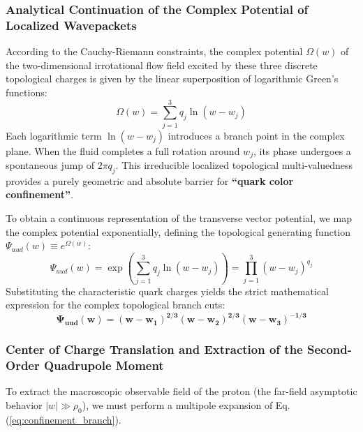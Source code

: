 \documentclass[12pt, a4paper]{article}
\begin{document}
\subsubsection{Analytical Continuation of the Complex Potential of Localized Wavepackets}

According to the Cauchy-Riemann constraints, the complex potential $\Omega(w)$ of the two-dimensional irrotational flow field excited by these three discrete topological charges is given by the linear superposition of logarithmic Green's functions:
\begin{equation}
\Omega(w) = \sum_{j=1}^3 q_j \ln(w - w_j) \label{eq:complex_potential_omega}
\end{equation}
Each logarithmic term $\ln(w - w_j)$ introduces a branch point in the complex plane. When the fluid completes a full rotation around $w_j$, its phase undergoes a spontaneous jump of $2\pi q_j$. This irreducible localized topological multi-valuedness provides a purely geometric and absolute barrier for \textbf{``quark color confinement''}.

To obtain a continuous representation of the transverse vector potential, we map the complex potential exponentially, defining the topological generating function $\Psi_{uud}(w) \equiv e^{\Omega(w)}$:
\begin{equation}
\Psi_{uud}(w) = \exp\left( \sum_{j=1}^3 q_j \ln(w - w_j) \right) = \prod_{j=1}^3 (w - w_j)^{q_j} \label{eq:gen_func_prod}
\end{equation}
Substituting the characteristic quark charges yields the strict mathematical expression for the complex topological branch cuts:
\begin{equation}
\mathbf{\Psi_{uud}(w) = (w - w_1)^{2/3} (w - w_2)^{2/3} (w - w_3)^{-1/3}} \label{eq:confinement_branch}
\end{equation}

\subsubsection{Center of Charge Translation and Extraction of the Second-Order Quadrupole Moment}

To extract the macroscopic observable field of the proton (the far-field asymptotic behavior $|w| \gg \rho_0$), we must perform a multipole expansion of Eq. (\ref{eq:confinement_branch}).
\end{document}
